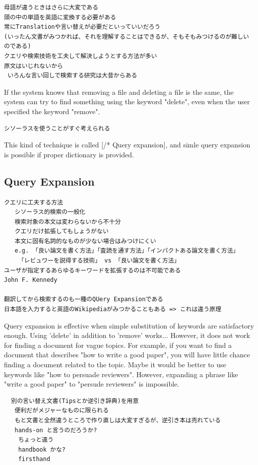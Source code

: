 \documentclass[manuscript,screen,review]{acmart}
\begin{document}
\begin{verbatim}
母語が違うときはさらに大変である
頭の中の単語を英語に変換する必要がある
常にTranslationや言い替えが必要だといっていいだろう
(いったん文書がみつかれば、それを理解することはできるが、そもそもみつけるのが難しいのである)
クエリや検索技術を工夫して解決しようとする方法が多い
原文はいじれないから
 いろんな言い回しで検索する研究は大昔からある
\end{verbatim}

If the system knows that removing a file and deleting a file is the same, the system can try to find something using the keyword "delete", even when the user specified the keyword "remove".

\begin{verbatim}
シソーラスを使うことがすぐ考えられる
\end{verbatim}

This kind of technique is called [/* Query expansion], and simle query
expansion is possible if proper dictionary is provided.

\subsection{Query Expansion}

\begin{verbatim}
クエリに工夫する方法
   シソーラス的検索の一般化
   検索対象の本文は変わらないから不十分
   クエリだけ拡張してもしょうがない
   本文に固有名詞的なものが少ない場合はみつけにくい
   e.g. 「良い論文を書く方法」「査読を通す方法」「インパクトある論文を書く方法」
    「レビュワーを説得する技術」 vs 「良い論文を書く方法」
ユーザが指定するあらゆるキーワードを拡張するのは不可能である
John F. Kennedy

翻訳してから検索するのも一種のQUery Expansionである
日本語を入力すると英語のWikipediaがみつかることもある => これは違う原理
\end{verbatim}

Query expansion is effective when simple substitution of keywords are satisfactory enough.
Using 'delete' in addition to 'remove' works...
However, it does not work for finding a document for vague topics.
For example, if you want to find a document that describes "how to write a good paper",
you will have little chance finding a document related to the topic.
Maybe it would be better to use keywords like "how to persuade reviewers".
However, expanding a phrase like "write a good paper" to "persude reviewers" is impossible.

\begin{verbatim}
  別の言い替え文書(Tipsとか逆引き辞典)を用意
   便利だがメジャーなものに限られる
   もと文書と全然違うところで作り直しは大変すぎるが、逆引き本は売れている
   hands-on と言うのだろうか?
    ちょっと違う
    handbook かな?
    firsthand
\end{verbatim}
\end{document}
